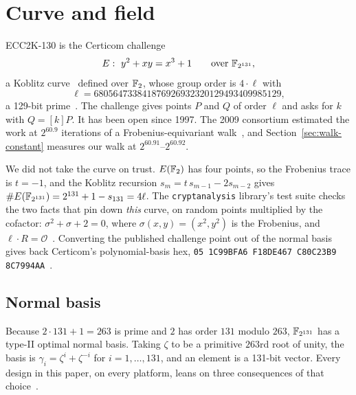 \section{Curve and field}
\label{sec:curve}

ECC2K-130 is the Certicom challenge~\cite{certicom1997}
\[
  E:\ y^2 + xy = x^3 + 1 \qquad\text{over }\mathbb{F}_{2^{131}},
\]
a Koblitz curve~\cite{koblitz1992} defined over $\mathbb{F}_2$, whose group
order is $4\cdot\ell$ with
\[
  \ell = 680564733841876926932320129493409985129,
\]
a 129-bit prime~. The
challenge gives points $P$ and $Q$ of order $\ell$ and asks for $k$
with $Q=[k]P$. It has been open since 1997. The 2009 consortium
estimated the work at $2^{60.9}$ iterations of a
Frobenius-equivariant walk~\cite{bailey2009}, and
Section~\ref{sec:walk-constant} measures our walk at
$2^{60.91}$--$2^{60.92}$.

We did not take the curve on trust. $E(\mathbb{F}_2)$ has four points, so
the Frobenius trace is $t=-1$, and the Koblitz recursion
$s_m = t\,s_{m-1} - 2 s_{m-2}$ gives $\#E(\mathbb{F}_{2^{131}}) = 2^{131}+1-s_{131}
= 4\ell$. The \texttt{cryptanalysis} library's test suite checks the two facts that
pin down \emph{this} curve, on random points multiplied by the
cofactor: $\sigma^2+\sigma+2=0$, where $\sigma(x,y)=(x^2,y^2)$ is the
Frobenius, and $\ell\cdot
R=\mathcal{O}$~.
Converting the published challenge point out of the normal basis gives
back Certicom's polynomial-basis hex, \texttt{05 1C99BFA6 F18DE467
C80C23B9 8C7994AA}~.

\subsection{Normal basis}
\label{sec:onb}

Because $2\cdot131+1=263$ is prime and $2$ has order $131$ modulo
$263$, $\mathbb{F}_{2^{131}}$ has a type-II optimal normal basis. Taking
$\zeta$ to be a primitive $263$rd root of unity, the basis is
$\gamma_i = \zeta^i + \zeta^{-i}$ for $i=1,\ldots,131$, and an element
is a 131-bit vector. Every design in this paper, on every platform,
leans on three consequences of that choice~.

